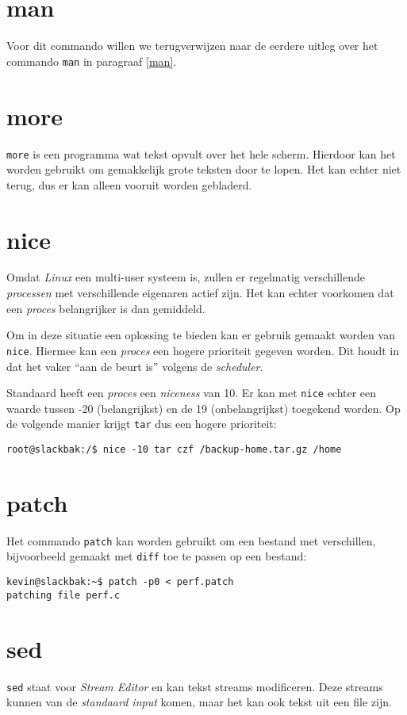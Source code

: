 \section{man}
Voor dit commando willen we terugverwijzen naar de eerdere uitleg over het commando \texttt{man} in paragraaf \ref{man}. 

\section{more}
\texttt{more} is een programma wat tekst opvult over het hele scherm. Hierdoor kan het worden gebruikt om gemakkelijk grote teksten door te lopen. Het kan echter niet terug, dus er kan alleen vooruit worden gebladerd. 

\section{nice}
Omdat \emph{Linux} een multi-user systeem is, zullen er regelmatig verschillende \emph{processen} met verschillende eigenaren actief zijn. Het kan echter voorkomen dat een \emph{proces} belangrijker is dan gemiddeld. 

Om in deze situatie een oplossing te bieden kan er gebruik gemaakt worden van \texttt{nice}. Hiermee kan een \emph{proces} een hogere prioriteit gegeven worden. Dit houdt in dat het vaker ``aan de beurt is'' volgens de \emph{scheduler}. 

Standaard heeft een \emph{proces} een \emph{niceness} van 10. Er kan met \texttt{nice} echter een waarde tussen -20 (belangrijkst) en de 19 (onbelangrijkst) toegekend worden. Op de volgende manier krijgt \texttt{tar} dus een hogere prioriteit:
\begin{lstlisting}
root@slackbak:/$ nice -10 tar czf /backup-home.tar.gz /home
\end{lstlisting}%

\section{patch}
Het commando \texttt{patch} kan worden gebruikt om een bestand met verschillen, bijvoorbeeld gemaakt met \texttt{diff} toe te passen op een bestand: 
\begin{lstlisting}
kevin@slackbak:~$ patch -p0 < perf.patch 
patching file perf.c
\end{lstlisting}%

\section{sed}
\texttt{sed} staat voor \emph{Stream Editor} en kan tekst streams modificeren. Deze streams kunnen van de \emph{standaard input} komen, maar het kan ook tekst uit een file zijn. 

